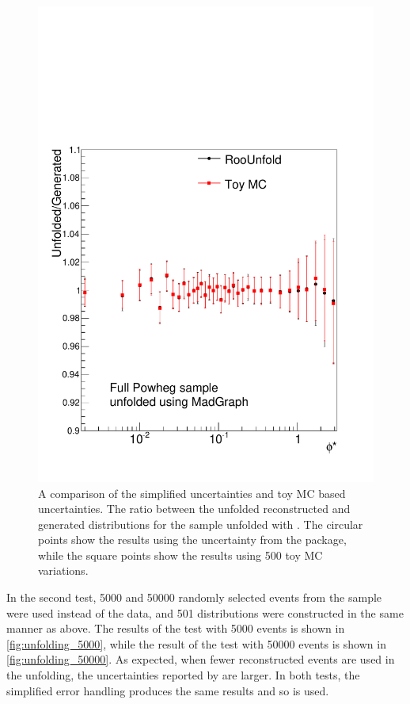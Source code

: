 \begin{figure}[!htbp]
    \centering
    \includegraphics[width=\SideBySidePlotWidth]{figures/BinM_MP_ALL.pdf}
    \caption[
        A comparison of \RooUnfold uncertainties and toy MC based
        uncertainties in unfolding.
    ]{
        A comparison of the simplified \RooUnfold uncertainties and toy MC
        based uncertainties. The ratio between the unfolded reconstructed and
        generated \phistar distributions for the \POWHEG sample unfolded with
        \MADGRAPH. The circular points show the results using the uncertainty
        from the \RooUnfold package, while the square points show the results
        using \num{500} toy MC variations.
    }
    \label{fig:toy_unfolding_results}
\end{figure}

In the second test, \num{5000} and \num{50000} randomly selected events from
the \POWHEG sample were used instead of the data, and 501 distributions were
constructed in the same manner as above. The results of the test with
\num{5000} events is shown in \cref{fig:unfolding_5000}, while the result
of the test with \num{50000} events is shown in \cref{fig:unfolding_50000}.
As expected, when fewer reconstructed events are used in the unfolding, the
uncertainties reported by \RooUnfold are larger. In both tests, the simplified
error handling produces the same results and so is used.

